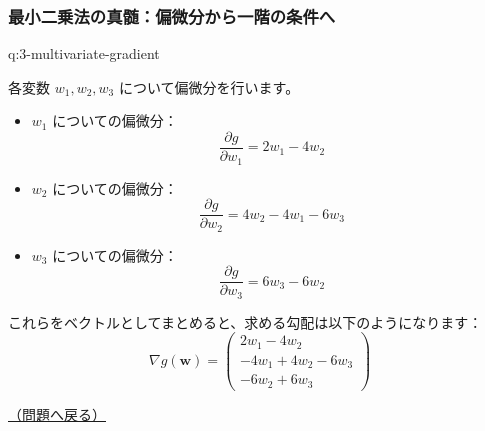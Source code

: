 \documentclass[
  pandoc]{bxjsarticle}
\providecommand{\tightlist}{%
  \setlength{\itemsep}{0pt}\setlength{\parskip}{0pt}}
\begin{document}
\subsubsection{最小二乗法の真髄：偏微分から一階の条件へ}\label{ux6700ux5c0fux4e8cux4e57ux6cd5ux306eux771fux9ac4ux504fux5faeux5206ux304bux3089ux4e00ux968eux306eux6761ux4ef6ux3078-1}

\begin{answerbox}[phantomlabel=a:3-multivariate-gradient]{q:3-multivariate-gradient}

各変数 \(\mathit{w}_1, \mathit{w}_2, \mathit{w}_3\)
について偏微分を行います。

\begin{itemize}
\tightlist
\item
  \(w_1\) についての偏微分： \[
  \frac{\partial g}{\partial w_1} = 2w_1 - 4w_2
  \]
\item
  \(w_2\) についての偏微分： \[
  \frac{\partial g}{\partial w_2} = 4w_2 - 4w_1 - 6w_3
  \]
\item
  \(w_3\) についての偏微分： \[
  \frac{\partial g}{\partial w_3} = 6w_3 - 6w_2
  \]
\end{itemize}

これらをベクトルとしてまとめると、求める勾配は以下のようになります： \[
\nabla g(\mathbf{w}) = \begin{pmatrix} 2w_1 - 4w_2 \\ -4w_1 + 4w_2 - 6w_3 \\ -6w_2 + 6w_3 \end{pmatrix}
\]

\hfill 

\hyperref[q:3-multivariate-gradient]{（問題へ戻る）}

\end{answerbox}
\end{document}
